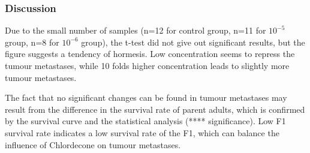 \subsubsection{Discussion}
Due to the small number of samples (n=12 for control group, n=11 for $10^{-5}$ group, n=8 for $10^{-6}$ group), the t-test did not give out significant results, but the figure suggests a tendency of hormesis. Low concentration seems to repress the tumour metastases, while 10 folds higher concentration leads to slightly more tumour metastases.

The fact that no significant changes can be found in tumour metastases may result from the difference in the survival rate of parent adults, which is confirmed by the survival curve and the statistical analysis (**** significance). Low F1 survival rate indicates a low survival rate of the F1, which can balance the influence of Chlordecone on tumour metastases.